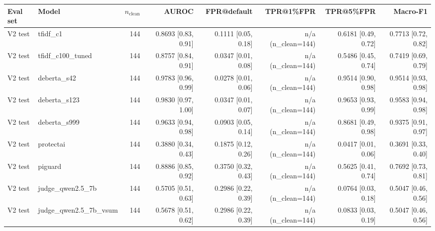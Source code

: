 \begin{tabular}{llrrrrrr}
\toprule
\textbf{Eval set} & \textbf{Model} & \textbf{$n_\text{clean}$} & \textbf{AUROC} & \textbf{FPR@default} & \textbf{TPR@1\%FPR} & \textbf{TPR@5\%FPR} & \textbf{Macro-F1} \\
\midrule
V2 test & tfidf\_c1 & 144 & 0.8693 {\scriptsize[0.83, 0.91]} & 0.1111 {\scriptsize[0.05, 0.18]} & n/a (n\_clean=144) & 0.6181 {\scriptsize[0.49, 0.72]} & 0.7713 {\scriptsize[0.72, 0.82]} \\
V2 test & tfidf\_c100\_tuned & 144 & 0.8757 {\scriptsize[0.84, 0.91]} & 0.0347 {\scriptsize[0.01, 0.08]} & n/a (n\_clean=144) & 0.5486 {\scriptsize[0.45, 0.74]} & 0.7419 {\scriptsize[0.69, 0.79]} \\
V2 test & deberta\_s42 & 144 & 0.9783 {\scriptsize[0.96, 0.99]} & 0.0278 {\scriptsize[0.01, 0.06]} & n/a (n\_clean=144) & 0.9514 {\scriptsize[0.90, 0.98]} & 0.9514 {\scriptsize[0.93, 0.98]} \\
V2 test & deberta\_s123 & 144 & 0.9830 {\scriptsize[0.97, 1.00]} & 0.0347 {\scriptsize[0.01, 0.07]} & n/a (n\_clean=144) & 0.9653 {\scriptsize[0.93, 0.99]} & 0.9583 {\scriptsize[0.94, 0.98]} \\
V2 test & deberta\_s999 & 144 & 0.9633 {\scriptsize[0.94, 0.98]} & 0.0903 {\scriptsize[0.05, 0.14]} & n/a (n\_clean=144) & 0.8681 {\scriptsize[0.49, 0.98]} & 0.9375 {\scriptsize[0.91, 0.97]} \\
V2 test & protectai & 144 & 0.3880 {\scriptsize[0.34, 0.43]} & 0.1875 {\scriptsize[0.12, 0.26]} & n/a (n\_clean=144) & 0.0417 {\scriptsize[0.01, 0.06]} & 0.3691 {\scriptsize[0.33, 0.40]} \\
V2 test & piguard & 144 & 0.8886 {\scriptsize[0.85, 0.92]} & 0.3750 {\scriptsize[0.32, 0.43]} & n/a (n\_clean=144) & 0.5625 {\scriptsize[0.41, 0.74]} & 0.7692 {\scriptsize[0.73, 0.81]} \\
V2 test & judge\_qwen2.5\_7b & 144 & 0.5705 {\scriptsize[0.51, 0.63]} & 0.2986 {\scriptsize[0.22, 0.39]} & n/a (n\_clean=144) & 0.0764 {\scriptsize[0.03, 0.18]} & 0.5047 {\scriptsize[0.46, 0.56]} \\
V2 test & judge\_qwen2.5\_7b\_vsum & 144 & 0.5678 {\scriptsize[0.51, 0.62]} & 0.2986 {\scriptsize[0.22, 0.39]} & n/a (n\_clean=144) & 0.0833 {\scriptsize[0.03, 0.19]} & 0.5047 {\scriptsize[0.46, 0.56]} \\

\end{tabular}
